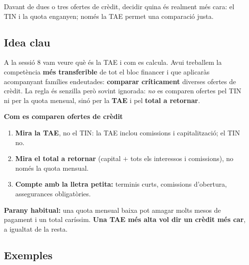 %
{Davant de dues o tres ofertes de crèdit, decidir quina és realment més cara: el TIN i la quota enganyen; només la TAE permet una comparació justa.}

\subsection{Idea clau}

A la sessió 8 vam veure què és la TAE i com es calcula. Avui treballem la competència
\textbf{més transferible} de tot el bloc financer i que aplicaràs acompanyant famílies
endeutades: \textbf{comparar críticament} diverses ofertes de crèdit. La regla és
senzilla però sovint ignorada: \emph{no} es comparen ofertes pel TIN ni per la quota
mensual, sinó per la \textbf{TAE} i pel \textbf{total a retornar}.

\begin{idea}
\textbf{Com es comparen ofertes de crèdit}
\begin{enumerate}[leftmargin=1.6em, itemsep=2pt]
  \item \textbf{Mira la TAE}, no el TIN: la TAE inclou comissions i capitalització; el
        TIN no.
  \item \textbf{Mira el total a retornar} (capital $+$ tots els interessos i
        comissions), no només la quota mensual.
  \item \textbf{Compte amb la lletra petita:} terminis curts, comissions d'obertura,
        assegurances obligatòries.
\end{enumerate}
\textbf{Parany habitual:} una quota mensual baixa pot amagar molts mesos de pagament i
un total caríssim. \textbf{Una TAE més alta vol dir un crèdit més car}, a igualtat de
la resta.
\end{idea}

\subsection{Exemples}

